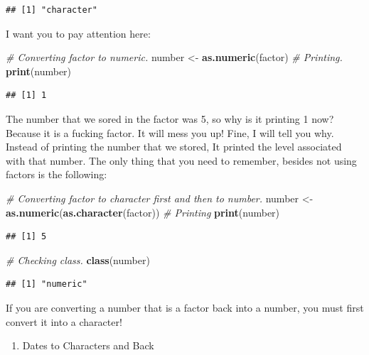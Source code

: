 \documentclass[]{book}
\newenvironment{Shaded}{\begin{snugshade}}{\end{snugshade}}
\newcommand{\CommentTok}[1]{\textcolor[rgb]{0.56,0.35,0.01}{\textit{#1}}}
\newcommand{\KeywordTok}[1]{\textcolor[rgb]{0.13,0.29,0.53}{\textbf{#1}}}
\newcommand{\NormalTok}[1]{#1}
\newcommand{\StringTok}[1]{\textcolor[rgb]{0.31,0.60,0.02}{#1}}
\providecommand{\tightlist}{%
  \setlength{\itemsep}{0pt}\setlength{\parskip}{0pt}}
\begin{document}
\begin{verbatim}
## [1] "character"
\end{verbatim}

I want you to pay attention here:

\begin{Shaded}
\begin{Highlighting}[]
\CommentTok{# Converting factor to numeric.}
\NormalTok{number <-}\StringTok{ }\KeywordTok{as.numeric}\NormalTok{(factor) }
\CommentTok{# Printing.}
\KeywordTok{print}\NormalTok{(number) }
\end{Highlighting}
\end{Shaded}

\begin{verbatim}
## [1] 1
\end{verbatim}

The number that we sored in the factor was 5, so why is it printing 1 now? Because it is a fucking factor. It will mess you up! Fine, I will tell you why. Instead of printing the number that we stored, It printed the level associated with that number. The only thing that you need to remember, besides not using factors is the following:

\begin{Shaded}
\begin{Highlighting}[]
\CommentTok{# Converting factor to character first and then to number.}
\NormalTok{number <-}\StringTok{ }\KeywordTok{as.numeric}\NormalTok{(}\KeywordTok{as.character}\NormalTok{(factor))}
\CommentTok{# Printing}
\KeywordTok{print}\NormalTok{(number)}
\end{Highlighting}
\end{Shaded}

\begin{verbatim}
## [1] 5
\end{verbatim}

\begin{Shaded}
\begin{Highlighting}[]
\CommentTok{# Checking class.}
\KeywordTok{class}\NormalTok{(number)}
\end{Highlighting}
\end{Shaded}

\begin{verbatim}
## [1] "numeric"
\end{verbatim}

If you are converting a number that is a factor back into a number, you must first convert it into a character!

\begin{enumerate}
\def\labelenumi{\arabic{enumi}.}
\setcounter{enumi}{3}
\tightlist
\item
  Dates to Characters and Back
\end{enumerate}
\end{document}
